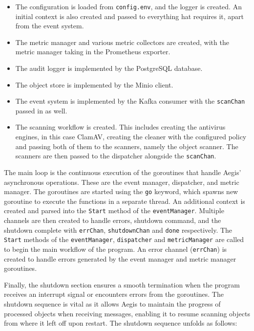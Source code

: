 \documentclass[12pt, conference, final, a4paper, onecolumn, compsoc]{IEEEtran}
\begin{document}
\medskip
\begin{itemize}
  \item The configuration is loaded from \texttt{config.env}, and the logger is
        created. An initial context is also created and passed to everything hat
        requires it, apart from the event system.
  \item The metric manager and various metric collectors are created, with the
        metric manager taking in the Prometheus exporter.
  \item The audit logger is implemented by the PostgreSQL database.
  \item The object store is implemented by the Minio client.
  \item The event system is implemented by the Kafka consumer with the
        \texttt{scanChan} passed in as well.
  \item The scanning workflow is created. This includes creating the antivirus
        engines, in this case ClamAV, creating the cleaner with the configured
        policy and passing both of them to the scanners, namely the object
        scanner. The scanners are then passed to the dispatcher alongside the
        \texttt{scanChan}.
\end{itemize}
\bigskip


The main loop is the continuous execution of the goroutines that handle Aegis'
asynchronous operations. These are the event manager, dispatcher, and metric
manager. The goroutines are started using the \texttt{go} keyword, which spawns
new goroutine to execute the functions in a separate thread. An additional
context is created and parsed into the \texttt{Start} method of the
\texttt{eventManager}. Multiple channels are then created to handle errors,
shutdown command, and the shutdown complete with \texttt{errChan},
\texttt{shutdownChan} and \texttt{done} respectively. The \texttt{Start} methods
of the \texttt{eventManager}, \texttt{dispatcher} and \texttt{metricManager} are
called to begin the main workflow of the program. An error channel
(\texttt{errChan}) is created to handle errors generated by the event manager
and metric manager goroutines.


Finally, the shutdown section ensures a smooth termination when the program
receives an interrupt signal or encounters errors from the goroutines. The
shutdown sequence is vital as it allows Aegis to maintain the progress of
processed objects when receiving messages, enabling it to resume scanning
objects from where it left off upon restart. The shutdown sequence unfolds as
follows:
\end{document}

